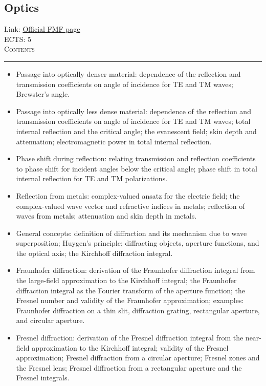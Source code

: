 \documentclass[11pt, a4paper]{article}
\newenvironment{course}[3]{
\subsection{#1}%
Link: \href{#2}{Official FMF page}\\%
ECTS: #3%
\vspace{1ex}
\\
{\large \textsc{Contents}}\\[-0.9ex]%
\rule{\textwidth}{0.5pt}
\vspace{-3ex}
}
{}
\newenvironment{chapter}[1]{
\begin{tcolorbox}[title=#1, breakable]
}
{\end{tcolorbox}}
\begin{document}
\begin{course}{Optics}{https://www.fmf.uni-lj.si/en/study-physics/programmes/1fiz/2020/7000777/courses/1165/}{5}
\begin{chapter}{Reflection and refraction}
\begin{itemize}
            \item Passage into optically denser material: dependence of the reflection and transmission coefficients on angle of incidence for TE and TM waves; Brewster's angle.
            
            \item Passage into optically less dense material: dependence of the reflection and transmission coefficients on angle of incidence for TE and TM waves; total internal reflection and the critical angle; the evanescent field; skin depth and attenuation; electromagnetic power in total internal reflection.

            \item Phase shift during reflection: relating transmission and reflection coefficients to phase shift for incident angles below the critical angle; phase shift in total internal reflection for TE and TM polarizations.

            \item Reflection from metals: complex-valued ansatz for the electric field; the complex-valued wave vector and refractive indices in metals; reflection of waves from metals; attenuation and skin depth in metals.
        
        \end{itemize}
    \end{chapter}

    \begin{chapter}{Diffraction}
        \begin{itemize}
        
            \item General concepts: definition of diffraction and its mechanism due to wave superposition; Huygen's principle; diffracting objects, aperture functions, and the optical axis; the Kirchhoff diffraction integral.

            \item Fraunhofer diffraction: derivation of the Fraunhofer diffraction integral from the large-field approximation to the Kirchhoff integral; the Fraunhofer diffraction integral as the Fourier transform of the aperture function; the Fresnel number and validity of the Fraunhofer approximation; examples: Fraunhofer diffraction on a thin slit, diffraction grating, rectangular aperture, and circular aperture.

            \item Fresnel diffraction: derivation of the Fresnel diffraction integral from the near-field approximation to the Kirchhoff integral; validity of the Fresnel approximation; Fresnel diffraction from a circular aperture; Fresnel zones and the Fresnel lens; Fresnel diffraction from a rectangular aperture and the Fresnel integrals.
        

\end{itemize}
\end{chapter}
\end{course}
\end{document}
